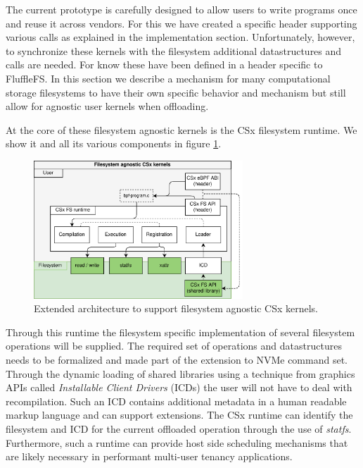 The current prototype is carefully designed to allow users to write programs
once and reuse it across vendors. For this we have created a specific header
supporting various calls as explained in the implementation section.
Unfortunately, however, to synchronize these kernels with the filesystem
additional datastructures and calls are needed. For know these have been defined
in a header specific to FluffleFS. In this section we describe a mechanism for
many computational storage filesystems to have their own specific behavior and
mechanism but still allow for agnostic user kernels when offloading.

At the core of these filesystem agnostic kernels is the CSx filesystem runtime.
We show it and all its various components in figure \ref{figure:csxfsruntime}.

\begin{figure}[H]
    \centering
	\includegraphics[width=0.7\textwidth]{resources/images/csx-fs-agnostic.png}
	\caption{Extended architecture to support filesystem agnostic CSx kernels.}
    \label{figure:csxfsruntime}
\end{figure}

Through this runtime the filesystem specific implementation of several
filesystem operations will be supplied. The required set of operations and
datastructures needs to be formalized and made part of the extension to NVMe
command set. Through the dynamic loading of shared libraries using a technique
from graphics APIs called \textit{Installable Client Drivers} (ICDs) the user
will not have to deal with recompilation. Such an ICD contains additional
metadata in a human readable markup language and can support extensions. The
CSx runtime can identify the filesystem and ICD for the current offloaded
operation through the use of \textit{statfs}. Furthermore, such a runtime can
provide host side scheduling mechanisms that are likely necessary in performant
multi-user tenancy applications.

